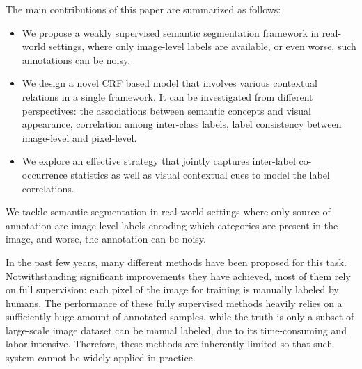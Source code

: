 The main contributions of this paper are summarized as follows:
\begin{itemize}
  \item We propose a weakly supervised semantic segmentation framework in real-world settings, where only image-level labels are available, or even worse, such annotations can be noisy.
  \item We design a novel CRF based model that involves various contextual relations in a single framework. It can be investigated from different perspectives: the associations between semantic concepts and visual appearance, correlation among inter-class labels, label consistency between image-level and pixel-level.
  \item We explore an effective strategy that jointly captures inter-label co-occurrence statistics as well as visual contextual cues to model the label correlations.
\end{itemize}


We tackle semantic segmentation in real-world settings where only source of annotation are image-level labels encoding which categories are present in the image, and worse, the annotation can be noisy.

In the past few years, many different methods \cite{csurka2011efficient,gonfaus2010harmony,ladicky2009associative,nowozin2010parameter,shotton2008semantic,shotton2006textonboost,singh2013nonparametric,verbeek2007scene,yang2007multiple,yao2012describing} have been proposed for this task. Notwithstanding significant improvements they have achieved, most of them rely on full supervision: each pixel of the image for training is manually labeled by humans. The performance of these fully supervised methods heavily relies on a sufficiently huge amount of annotated samples, while the truth is only a subset of large-scale image dataset can be manual labeled, due to its time-consuming and labor-intensive. Therefore, these methods are inherently limited so that such system cannot be widely applied in practice.

